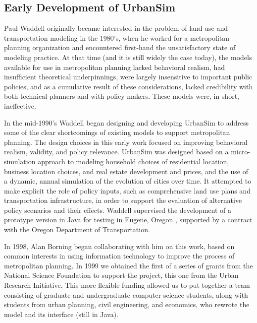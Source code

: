 
\subsection{Early Development of UrbanSim}

Paul Waddell originally became interested in the problem of land use
and transportation modeling in the 1980's, when he worked for a
metropolitan planning organization and encountered first-hand the
unsatisfactory state of modeling practice.  At that time (and it is
still widely the case today), the models available for use in
metropolitan planning lacked behavioral realism, had insufficient
theoretical underpinnings, were largely insensitive to important
public policies, and as a cumulative result of these considerations,
lacked credibility with both technical planners and with
policy-makers. These models were, in short, ineffective.

In the mid-1990's Waddell began designing and developing UrbanSim to
address some of the clear shortcomings of existing models to support
metropolitan planning.  The design choices in this early work
focused on improving behavioral realism, validity, and policy
relevance.  UrbanSim was designed based on a micro-simulation
approach to modeling household choices of residential location,
business location choices, and real estate development and prices,
and the use of a dynamic, annual simulation of the evolution of
cities over time.  It attempted to make explicit the role of policy
inputs, such as comprehensive land use plans and transportation
infrastructure, in order to support the evaluation of alternative
policy scenarios and their effects.  Waddell supervised the
development of a prototype version in Java for testing in Eugene,
Oregon \cite{waddell-env-and-planning-2000}, supported by a contract
with the Oregon Department of Transportation.

In 1998, Alan Borning began collaborating with him on this work,
based on common interests in using information technology to improve
the process of metropolitan planning. In 1999 we obtained the first
of a series of grants from the National Science Foundation to
support the project, this one from the Urban Research Initiative.
This more flexible funding allowed us to put together a team
consisting of graduate and undergraduate computer science students,
along with students from urban planning, civil engineering, and
economics, who rewrote the model and its interface (still in Java).

